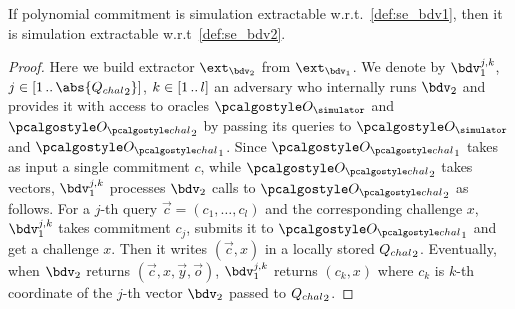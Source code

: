 \documentclass[runningheads,11pt]{llncs}
\let\spvec\vec \let\vec\accentvec
\let\vec\spvec
\begin{document}
\begin{lemma}[]
  If polynomial commitment is simulation extractable w.r.t.~\cref{def:se_bdv1}, then
  it is simulation extractable w.r.t~\cref{def:se_bdv2}.
\end{lemma}
\begin{proof}
  Here we build extractor $\ext_{\bdv_2}$ from $\ext_{\bdv_1}$. We denote by
  $\bdv_1^{j,k}$, $j \in \range{1}{\abs{\Qchal_2}}$, $k \in [1 \, .. \, l]$
   an adversary who
  internally runs $\bdv_2$ and provides it with access to oracles $\oracles$ and
  $\oraclec_2$ by passing its queries to $\oracles$ and $\oraclec_1$. Since
  $\oraclec_1$ takes as input a single commitment $c$, while $\oraclec_2$ takes
  vectors, $\bdv_1^{j, k}$ processes $\bdv_2$ calls to $\oraclec_2$ as follows. For a
  $j$-th query $\vec{c} = (c_1, \ldots, c_l)$ and the corresponding challenge $x$,
  $\bdv_1^{j, k}$ takes commitment $c_j$, submits it to $\oraclec_1$ and get a
  challenge $x$. Then it writes $(\vec{c}, x)$ in a locally stored
  ${Q_{chal}}_2$. Eventually, when $\bdv_2$ returns $(\vec{c}, x, \vec{y}, \vec{o})$,
  $\bdv_1^{j, k}$ returns $(c_k, x)$ where $c_k$ is $k$-th coordinate of the $j$-th
  vector $\bdv_2$ passed to ${Q_{chal}}_2$.
\end{proof}
\end{document}
